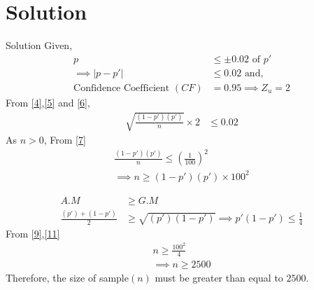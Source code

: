 \documentclass{beamer}
\begin{document}
\section{Solution}
\begin{frame}{Solution}
    Given,\\
    \begin{align}
        p &\leq \pm 0.02 \text{ of }p'\\
        \implies |p-p'| &\leq 0.02\label{5} \text{ and, }\\
       \text{Confidence Coefficient } (CF) &= 0.95
        \implies Z_u = 2 \label{6}
    \end{align}
From \eqref{4},\eqref{5} and \eqref{6},
    \begin{align}
        \sqrt{\frac{(1-p')(p')}{n}} \times 2 & \leq 0.02 \label{7}
    \end{align}
As $n >0 $, From \eqref{7}
    \begin{align}
        \frac{(1-p')(p')}{n} \leq \left(\frac{1}{100}\right)^2\\
        \implies n \geq {(1-p')(p')} \times 100^2 \label{9}
    \end{align}

\end{frame}
\begin{frame}{}
\begin{align}
    A.M &\geq G.M\\
    \frac{(p')+(1-p')}{2} &\geq \sqrt{(p')(1-p')}
    \implies p'(1-p') \leq \frac{1}{4} \label{11}
\end{align}
    From \eqref{9},\eqref{11}
    \begin{align}
        n \geq \frac{100^2}{4}\\
        \implies n \geq 2500
    \end{align}
Therefore,
the size of sample$(n)$ must be greater than equal to $2500$.
\end{frame}
\end{document}
